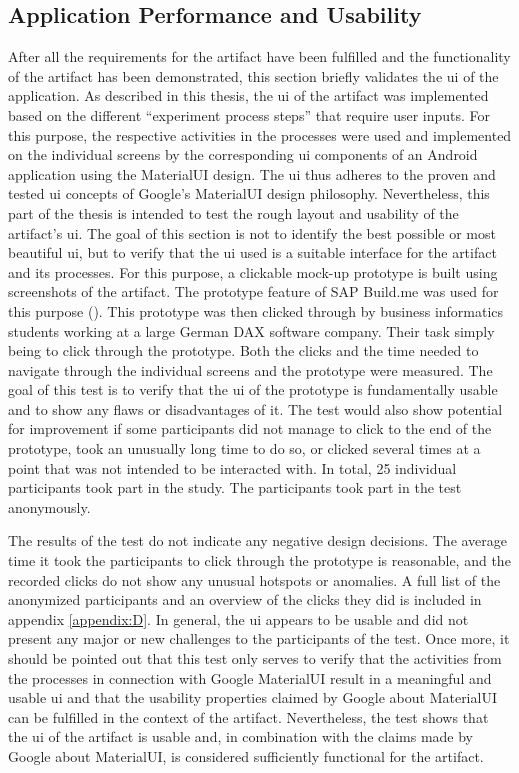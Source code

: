\subsection{Application Performance and Usability}

After all the requirements for the artifact have been fulfilled and the functionality of the artifact has been demonstrated, this section briefly validates the \ac{ui} of the application. As described in this thesis, the \ac{ui} of the artifact was implemented based on the different \enquote{experiment process steps} that require user inputs. For this purpose, the respective activities in the processes were used and implemented on the individual screens by the corresponding \ac{ui} components of an Android application using the MaterialUI design. The \ac{ui} thus adheres to the proven and tested \ac{ui} concepts of Google's MaterialUI design philosophy. Nevertheless, this part of the thesis is intended to test the rough layout and usability of the artifact's \ac{ui}. The goal of this section is not to identify the best possible or most beautiful \ac{ui}, but to verify that the \ac{ui} used is a suitable interface for the artifact and its processes. For this purpose, a clickable mock-up prototype is built using screenshots of the artifact. The prototype feature of SAP Build.me was used for this purpose (\cite{SAP.2023}). This prototype was then clicked through by business informatics students working at a large German DAX software company. Their task simply being to click through the prototype. Both the clicks and the time needed to navigate through the individual screens and the prototype were measured. The goal of this test is to verify that the \ac{ui} of the prototype is fundamentally usable and to show any flaws or disadvantages of it. The test would also show potential for improvement if some participants did not manage to click to the end of the prototype, took an unusually long time to do so, or clicked several times at a point that was not intended to be interacted with. In total, 25 individual participants took part in the study. The participants took part in the test anonymously. 

The results of the test do not indicate any negative design decisions. The average time it took the participants to click through the prototype is reasonable, and the recorded clicks do not show any unusual hotspots or anomalies. A full list of the anonymized participants and an overview of the clicks they did is included in appendix \ref{appendix:D}. In general, the \ac{ui} appears to be usable and did not present any major or new challenges to the participants of the test. Once more, it should be pointed out that this test only serves to verify that the activities from the processes in connection with Google MaterialUI result in a meaningful and usable \ac{ui} and that the usability properties claimed by Google about MaterialUI can be fulfilled in the context of the artifact. Nevertheless, the test shows that the \ac{ui} of the artifact is usable and, in combination with the claims made by Google about MaterialUI, is considered sufficiently functional for the artifact.
